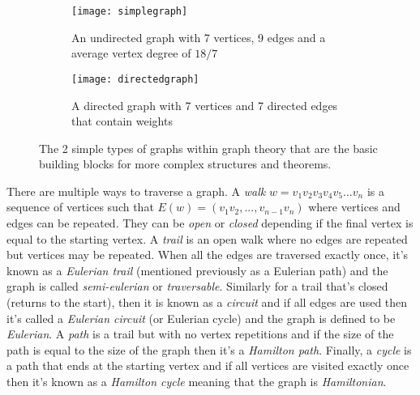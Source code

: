 \begin{figure}[!htb]
\centering
\begin{subfigure}{.45\textwidth}
	\texttt{[image: simplegraph]}
	\caption{An undirected graph with 7 vertices, 9 edges and a average vertex degree of $18/7$}
	\label{fig:Simple Graph}
\end{subfigure}
\hfill
\begin{subfigure}{.45\textwidth}
	\texttt{[image: directedgraph]}
	\caption{A directed graph with 7 vertices and 7 directed edges that contain weights}
	\label{fig:Directed Graph}
\end{subfigure}
\caption{The 2 simple types of graphs within graph theory that are the basic building blocks for more complex structures and theorems.}
\end{figure}

There are multiple ways to traverse a graph. A \emph{walk} $w = v_1v_2v_3v_4v_5...v_n$ is a sequence of vertices such that $E(w) = (v_1v_2,...,v_{n-1}v_n)$ where vertices and edges can be repeated. They can be \emph{open} or \emph{closed} depending if the final vertex is equal to the starting vertex. A \emph{trail} is an open walk where no edges are repeated but vertices may be repeated. When all the edges are traversed exactly once, it's known as a \emph{Eulerian trail} (mentioned previously as a Eulerian path) and the graph is called \emph{semi-eulerian} or \emph{traversable}. Similarly for a trail that's closed (returns to the start), then it is known as a \emph{circuit} and if all edges are used then it's called a \emph{Eulerian circuit} (or Eulerian cycle) and the graph is defined to be \emph{Eulerian}. A \emph{path} is a trail but with no vertex repetitions and if the size of the path is equal to the size of the graph then it's a \emph{Hamilton path}. Finally, a \emph{cycle} is a path that ends at the starting vertex and if all vertices are visited exactly once then it's known as a \emph{Hamilton cycle} meaning that the graph is \emph{Hamiltonian}.
\newline

